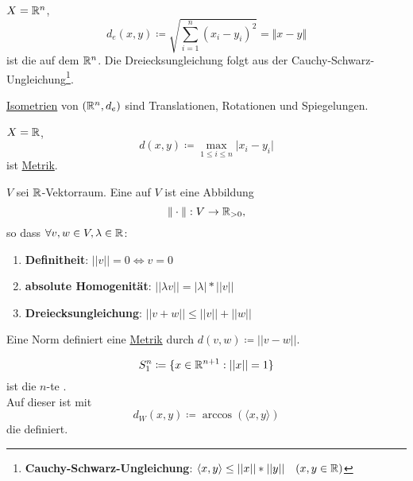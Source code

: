 \begin{example}
  \label{bsp:standardmetrik}
  $ X = \mathbb{R}^n $,
  \begin{equation*}
    d_e(x, y) \coloneqq \sqrt{\sum_{i=1}^n(x_i-y_i)^2} = \Vert x-y \Vert
  \end{equation*}
  ist die  auf dem $ \mathbb{R}^n $. Die Dreiecksungleichung folgt aus der Cauchy-Schwarz-Ungleichung\footnote{\textbf{Cauchy-Schwarz-Ungleichung}: $ \langle x, y \rangle \leq ||x||*||y|| \quad (x, y \in \mathbb{R}) $}.
\end{example}

\begin{remark}[aus LA II]
  \hyperref[def:isometrie]{Isometrien} von $ (\mathbb{R}^n, d_e) $ sind Translationen, Rotationen und Spiegelungen.
\end{remark}

\begin{example}[Maximumsmetrik]
  \label{bsp:maximumsmetrik}
  $ X = \mathbb{R} $,
  \begin{equation*}
    d(x, y) \coloneqq \underset{1 \leq i \leq n}{\max} \vert x_i-y_i \vert
  \end{equation*}
  ist \hyperref[def:metrik]{Metrik}.
\end{example}

\begin{example}
  \label{bsp:norm}
  $ V $ sei $ \mathbb{R} $-Vektorraum. Eine  auf $ V $ ist eine Abbildung 
  \begin{equation*}
    \Vert\cdot\Vert : V \to \mathbb{R}_{>0}\text{,}
  \end{equation*}
  so dass $ \forall v, w \in V, \lambda \in \mathbb{R} $:
  \begin{enumerate}
    \item \textbf{Definitheit}: $ ||v|| = 0 \Leftrightarrow v = 0 $
    \item \textbf{absolute Homogenität}: $ ||\lambda v|| = |\lambda| * ||v|| $
    \item \textbf{Dreiecksungleichung}: $ ||v+w|| \leq ||v||+||w|| $
  \end{enumerate}
  Eine Norm definiert eine \hyperref[def:metrik]{Metrik} durch $ d(v, w) \coloneqq ||v-w|| $.
\end{example}

\clearpage

\begin{example}[Einheitssphäre]
  \label{bsp:einheitssphaere}
  \begin{equation*}
    S_1^n \coloneqq \{ x \in \mathbb{R}^{n+1} : ||x|| = 1 \}
  \end{equation*}
  ist die $ n $-te . \\
  Auf dieser ist mit
  \begin{equation*}
     d_W(x, y) \coloneqq \arccos(\langle x, y \rangle)
  \end{equation*}
  die  definiert.
\end{example}


